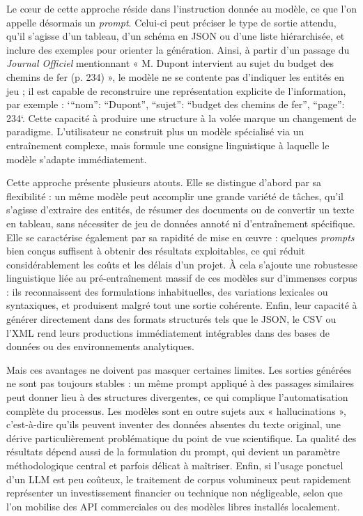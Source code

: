 Le cœur de cette approche réside dans l’instruction donnée au modèle, ce que l’on appelle désormais un \emph{prompt}. Celui-ci peut préciser le type de sortie attendu, qu’il s’agisse d’un tableau, d’un schéma en JSON ou d’une liste hiérarchisée, et inclure des exemples pour orienter la génération. Ainsi, à partir d’un passage du \emph{Journal Officiel} mentionnant « M. Dupont intervient au sujet du budget des chemins de fer (p. 234) », le modèle ne se contente pas d’indiquer les entités en jeu ; il est capable de reconstruire une représentation explicite de l’information, par exemple : `{\enquote{nom}: \enquote{Dupont}, \enquote{sujet}: \enquote{budget des chemins de fer}, \enquote{page}: 234}`. Cette capacité à produire une structure à la volée marque un changement de paradigme. L’utilisateur ne construit plus un modèle spécialisé via un entraînement complexe, mais formule une consigne linguistique à laquelle le modèle s’adapte immédiatement.

Cette approche présente plusieurs atouts. Elle se distingue d’abord par sa flexibilité : un même modèle peut accomplir une grande variété de tâches, qu’il s’agisse d’extraire des entités, de résumer des documents ou de convertir un texte en tableau, sans nécessiter de jeu de données annoté ni d’entraînement spécifique. Elle se caractérise également par sa rapidité de mise en œuvre : quelques \emph{prompts} bien conçus suffisent à obtenir des résultats exploitables, ce qui réduit considérablement les coûts et les délais d’un projet. À cela s’ajoute une robustesse linguistique liée au pré-entraînement massif de ces modèles sur d’immenses corpus : ils reconnaissent des formulations inhabituelles, des variations lexicales ou syntaxiques, et produisent malgré tout une sortie cohérente. Enfin, leur capacité à générer directement dans des formats structurés tels que le JSON, le CSV ou l’XML rend leurs productions immédiatement intégrables dans des bases de données ou des environnements analytiques.

Mais ces avantages ne doivent pas masquer certaines limites. Les sorties générées ne sont pas toujours stables : un même prompt appliqué à des passages similaires peut donner lieu à des structures divergentes, ce qui complique l’automatisation complète du processus. Les modèles sont en outre sujets aux « hallucinations », c’est-à-dire qu’ils peuvent inventer des données absentes du texte original, une dérive particulièrement problématique du point de vue scientifique. La qualité des résultats dépend aussi de la formulation du prompt, qui devient un paramètre méthodologique central et parfois délicat à maîtriser. Enfin, si l’usage ponctuel d’un LLM est peu coûteux, le traitement de corpus volumineux peut rapidement représenter un investissement financier ou technique non négligeable, selon que l’on mobilise des API commerciales ou des modèles libres installés localement.

